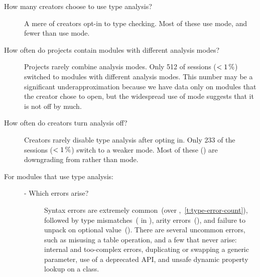 \documentclass[english,submission,cleveref]{programming}
\begin{document}
\begin{description}
  \item[How many creators choose to use type analysis?]
    A mere  of creators opt-in to type checking.
    Most of these use \mnonstrict{} mode, and fewer than 
    use \mstrict{} mode.

  \item[How often do projects contain modules with different analysis modes?]
    Projects rarely combine analysis modes.
    Only 512 of  sessions ($<\SI{1}{\percent}$) switched to modules with different
    analysis modes.
    This number may be a significant underapproximation because we have data
    only on modules that the creator chose to open, but the widespread use
    of \mnocheck{} mode suggests that it is not off by much.

  \item[How often do creators turn analysis off?]
    Creators rarely disable type analysis after opting in.
    Only 233 of the  sessions ($<\SI{1}{\percent}$)
    switch to a weaker mode.
    Most of these () are downgrading from \mstrict{}
    rather than \mnonstrict{} mode.



  \item[For modules that use type analysis:]\leavevmode
    \begin{description}
      \item[- Which errors arise?]
        Syntax errors are extremely common~(over ,~\cref{t:type-error-count}), 
        followed by type mismatches~( in \mstrict{}),
        arity errors~(),
        and failure to unpack on optional value~().
        There are several uncommon errors, such as misusing a table operation,
        and a few that never arise: internal and too-complex errors,
        duplicating or swapping a generic parameter, use of a deprecated API,
        and unsafe dynamic property lookup on a class.


\end{description}
\end{description}
\end{document}
